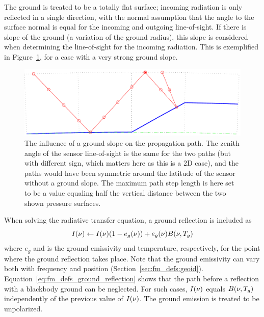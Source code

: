 \label{sec:fm_defs:groundrefl}

The ground is treated to be a totally flat surface; incoming radiation
is only reflected in a single direction, with the normal assumption
that the angle to the surface normal is equal for the incoming and
outgoing line-of-sight. If there is slope of the ground (a variation of the ground radius), this slope is considered
when determining the line-of-sight for the incoming radiation. This is
exemplified in Figure~\ref{fig:fm_defs:ppath_cases2}, for a case with
a very strong ground slope.

\begin{figure}[!t]
 \begin{center}
  \includegraphics*[width=0.95\hsize]{Figs/fm_definitions/ppath_cases2}
  \caption{The influence of a ground slope on the propagation path. The zenith
    angle of the sensor line-of-sight is the same for the two paths (but with
    different sign, which matters here as this is a 2D case), and the paths
    would have been symmetric around the latitude of the sensor without a 
    ground slope. The maximum path step length is here set to be a value
    equaling half the vertical distance between the two shown pressure
    surfaces.}
  \label{fig:fm_defs:ppath_cases2}
 \end{center}
\end{figure}

When solving the radiative transfer equation, a ground reflection is
included as
\begin{equation}
  I(\nu) \gets I(\nu)(1-e_g(\nu)) + e_g(\nu)B(\nu,T_{g})
  \label{eq:fm_defs_ground_reflection}
\end{equation}
where $e_g$ and  is the ground emissivity and temperature,
respectively, for the point where the ground reflection takes place.
Note that the ground emissivity can vary both with frequency and
position (Section~\ref{sec:fm_defs:geoid}).
Equation~\ref{eq:fm_defs_ground_reflection} shows that the path before
a reflection with a blackbody ground can be neglected. For such cases,
$I(\nu)$ equals $B(\nu,T_{g})$ independently of the previous
value of $I(\nu)$. The ground emission is treated to be
unpolarized.

